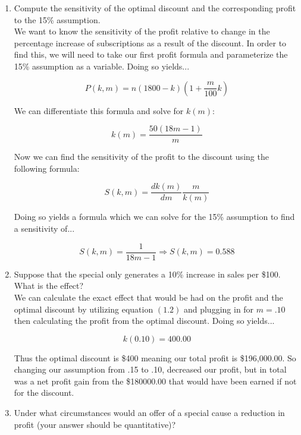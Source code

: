 \documentclass[11pt]{article}
\begin{document}
\begin{enumerate}
\begin{enumerate}
    \item Compute the sensitivity of the optimal discount and the corresponding profit to the
    15\% assumption. \\
    
    We want to know the sensitivity of the profit relative to change in the
    percentage increase of subscriptions as a result of the discount. In order to
    find this, we will need to take our first profit formula and parameterize the
    15\% assumption as a variable. Doing so yields...
    
    $$P(k,m)=n\left(1800-k\right) \left(1 + \frac{m}{100} k\right)$$
    
    We can differentiate this formula and solve for $k(m)$:
    
    \begin{equation}
    k(m) = \frac{50 (18m - 1)}{m}
    \end{equation}
    
    Now we can find the sensitivity of the profit to the discount using the
    following formula:
    
    $$S(k,m) = \frac{dk(m)}{dm} \frac{m}{k(m)} $$
    
    Doing so yields a formula which we can solve for the 15\% assumption to find a
    sensitivity of...
    
    $$S(k,m) = \frac{1}{18m - 1} \Rightarrow S(k,m) = 0.588$$
    
    \newpage
    \item Suppose that the special only generates a 10\% increase in sales per \$100. What is the
    effect? \\
    
    We can calculate the exact effect that would be had on the profit and the
    optimal discount by utilizing equation $(1.2)$ and plugging in for $m = .10$
    then calculating the profit from the optimal discount. Doing so yields...
    
    \[k(0.10) = 400.00\]
    
    Thus the optimal discount is \$400 meaning our total profit is \$196,000.00. So
    changing our assumption from .15 to .10, decreased our profit, but in total was
    a net profit gain from the \$180000.00 that would have been earned if not for
    the discount.
    
    \item Under what circumstances would an offer of a special cause a reduction in profit (your
    answer should be quantitative)? \\
    

\end{enumerate}
\end{enumerate}
\end{document}
